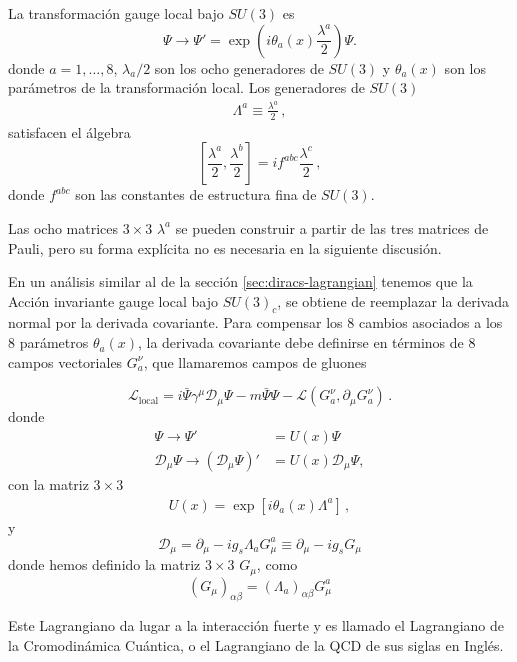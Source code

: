 \begin{frame}
  
La transformación gauge local bajo $SU(3)$ es
\begin{equation}
  \Psi\to \Psi'=\exp\left(i\theta_a(x)\frac{\lambda^a}{2}\right)\Psi.
\end{equation}
donde $a=1,\ldots,8$, $\lambda_a/2$ son los ocho generadores de $SU(3)$ y $\theta_a(x)$ son los parámetros de la transformación local. Los generadores de $SU(3)$
\begin{align}
  \Lambda^a\equiv\frac{\lambda^a}{2}\,,
\end{align}
satisfacen el álgebra
\begin{equation}
  \left[\frac{\lambda^a}{2},\frac{\lambda^b}{2}\right]=if^{abc}\frac{\lambda^c}{2}\,,
\end{equation}
donde $f^{abc}$ son las constantes de estructura fina de $SU(3)$.
\end{frame}

Las ocho matrices $3\times3$ $\lambda^a$ se pueden construir a partir de las tres matrices de Pauli, pero su forma explícita no es necesaria en la siguiente discusión.

En un análisis similar al de la sección \ref{sec:diracs-lagrangian} tenemos que la Acción invariante gauge local bajo $SU(3)_c$, se obtiene de reemplazar la derivada normal por la derivada covariante. Para compensar los 8 cambios asociados a los 8 parámetros $\theta_a(x)$, la derivada covariante debe definirse en términos de 8 campos vectoriales $G^\nu_a$, que llamaremos campos de gluones
\begin{frame}
\begin{equation}
  \label{eq:127qft}
  \mathcal{L}_{\text{local}}=i\bar{\Psi}\gamma^\mu\mathcal{D}_\mu\Psi-m\bar{\Psi}\Psi
  -\mathcal{L}\left( G^{\nu}_{a},\partial_{\mu}G^{\nu}_{a} \right)\,.%
\end{equation}
donde
\begin{align}
  \label{eq:qcdtr}
  \Psi\to \Psi'&=U(x)\Psi\nonumber\\
  \mathcal{D}_\mu\Psi\to \left(\mathcal{D}_\mu\Psi\right)'&
  =U(x)\mathcal{D}_\mu\Psi,
\end{align}
con la matriz $3\times 3$
\begin{align}
  U(x)=\exp\left[i\theta_a(x){\Lambda^a}\right]\,,
\end{align}
y
\begin{equation}
  \mathcal{D}_\mu=\partial_\mu-i g_s{\Lambda_a}G_\mu^a\equiv\partial_\mu-i g_s {G}_\mu
\end{equation}
donde hemos definido la matriz $3\times 3$  $G_\mu$, como
\begin{equation}
  \left({G}_\mu\right)_{\alpha\beta}=\left( \Lambda_a \right)_{\alpha\beta}G_\mu^a
\end{equation}
\end{frame}
Este Lagrangiano da lugar a la interacción fuerte y es llamado el Lagrangiano de la Cromodinámica Cuántica, o el Lagrangiano de la QCD de sus siglas en Inglés.

